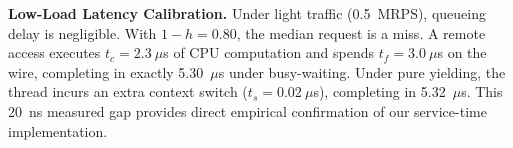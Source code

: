 \textbf{Low-Load Latency Calibration.} Under light traffic (0.5~MRPS), queueing delay is negligible. With $1-h = 0.80$, the median request is a miss. A remote access executes $t_c = 2.3~\mu$s of CPU computation and spends $t_f = 3.0~\mu$s on the wire, completing in exactly 5.30~$\mu$s under busy-waiting. Under pure yielding, the thread incurs an extra context switch ($t_s = 0.02~\mu$s), completing in 5.32~$\mu$s. This 20~ns measured gap provides direct empirical confirmation of our service-time implementation.
